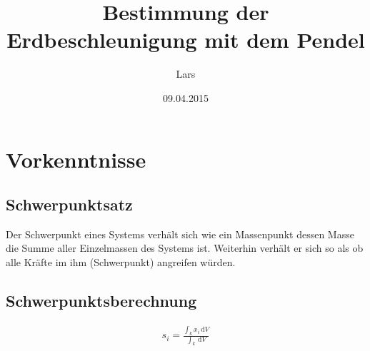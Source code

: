 \documentclass[a4paper,12pt]{scrartcl}
\title{Bestimmung der Erdbeschleunigung mit dem Pendel}
\author{Lars}
\date{09.04.2015}
\begin{document}
\maketitle
\tableofcontents
\newpage
\section{Vorkenntnisse}
\subsection{Schwerpunktsatz}
Der Schwerpunkt eines Systems verhält sich wie ein Massenpunkt dessen Masse die Summe aller Einzelmassen des Systems ist. Weiterhin verhält er sich so als ob alle Kräfte im ihm (Schwerpunkt) angreifen würden. 
\subsection{Schwerpunktsberechnung}

\begin{align}
s_i=\frac{\int_k \! x_i \, \mathrm{d}V}{\int_k \!  \, \mathrm{d}V}  
\end{align}

\begin{comment}
\begin{figure}[h]
\begin{center}
\texttt{[image: Bilder/Schwerpunkt.jpg]}
\caption{Schwerpunkt}
\label{schwerpunkt}
\end{center}
\end{figure}
\end{comment}
\end{document}
